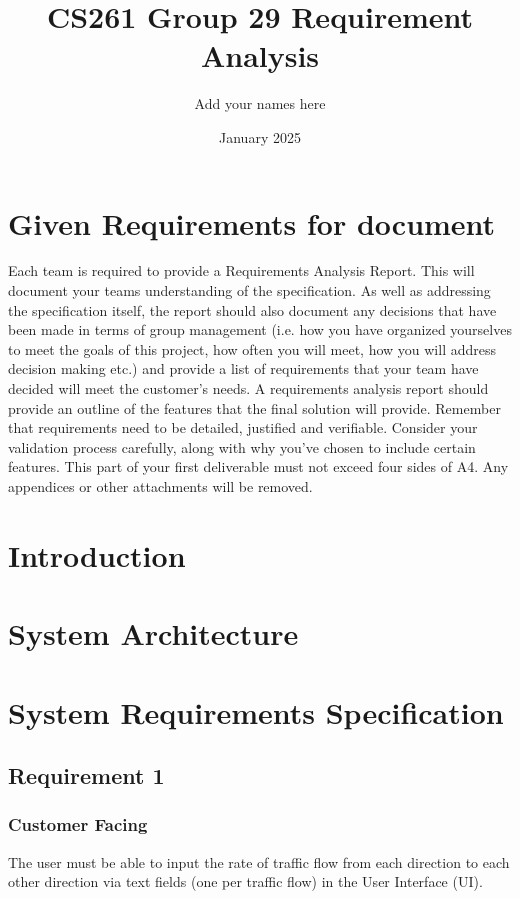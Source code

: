 \documentclass{article}
\title{CS261 Group 29 Requirement Analysis}
\author{Add your names here}
\date{January 2025}
\begin{document}
\maketitle

\section{Given Requirements for document}
Each team is required to provide a Requirements Analysis Report. This will 
document your teams understanding of the specification. As well as addressing 
the specification itself, the report should also document any decisions that 
have been made in terms of group management (i.e. how you have organized 
yourselves to meet the goals of this project, how often you will meet, how you 
will address decision making etc.) and provide a list of requirements that 
your team have decided will meet the customer's needs.
A requirements analysis report should provide an outline of the features that 
the final solution will provide. Remember that requirements need to be detailed, 
justified and verifiable. Consider your validation process carefully, along 
with why you've chosen to include certain features. This part of your first 
deliverable must not exceed four sides of A4. Any appendices or other attachments 
will be removed.

\section{Introduction}
\section{System Architecture}

\section{System Requirements Specification}
\subsection{Requirement 1}
\subsubsection{Customer Facing}
The user must be able to input the rate of traffic flow from 
each direction to each other direction via text fields (one per traffic flow) 
in the User Interface (UI).
\end{document}
